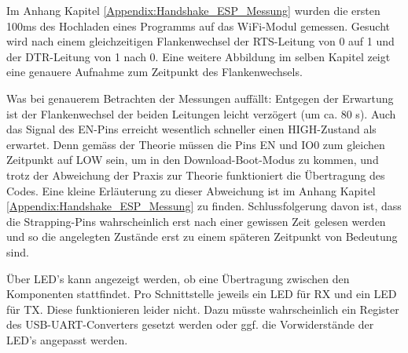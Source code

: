 \begin{enumerate}
\begin{enumerate}
Im Anhang Kapitel \ref{Appendix:Handshake_ESP_Messung} wurden die ersten 100ms des Hochladen eines Programms auf das WiFi-Modul gemessen. Gesucht wird nach einem gleichzeitigen Flankenwechsel der RTS-Leitung von 0 auf 1 und der DTR-Leitung von 1 nach 0. Eine weitere Abbildung im selben Kapitel zeigt eine genauere Aufnahme zum Zeitpunkt des Flankenwechsels.

Was bei genauerem Betrachten der Messungen auffällt: Entgegen der Erwartung ist der Flankenwechsel der beiden Leitungen leicht verzögert (um ca. 80 \textmu s). Auch das Signal des EN-Pins erreicht wesentlich schneller einen HIGH-Zustand als erwartet. Denn gemäss der Theorie müssen die Pins EN und IO0 zum gleichen Zeitpunkt auf LOW sein, um in den Download-Boot-Modus zu kommen, und trotz der Abweichung der Praxis zur Theorie funktioniert die Übertragung des Codes. Eine kleine Erläuterung zu dieser Abweichung ist im Anhang Kapitel \ref{Appendix:Handshake_ESP_Messung} zu finden. Schlussfolgerung davon ist, dass die Strapping-Pins wahrscheinlich erst nach einer gewissen Zeit gelesen werden und so die angelegten Zustände erst zu einem späteren Zeitpunkt von Bedeutung sind.

\end{enumerate}

\end{enumerate}


Über LED's kann angezeigt werden, ob eine Übertragung zwischen den Komponenten stattfindet. Pro Schnittstelle jeweils ein LED für RX und ein LED für TX. Diese funktionieren leider nicht. Dazu müsste wahrscheinlich ein Register des USB-UART-Converters gesetzt werden oder ggf. die Vorwiderstände der LED's angepasst werden.